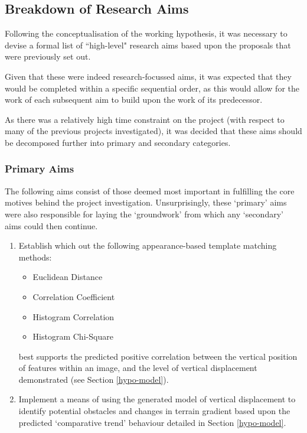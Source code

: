 \subsection{Breakdown of Research Aims}

Following the conceptualisation of the working hypothesis, it was necessary to devise a formal list of ``high-level" research aims based upon the proposals that were previously set out. 

Given that these were indeed research-focussed aims, it was expected that they would be completed within a specific sequential order, as this would allow for the work of each subsequent aim to build upon the work of its predecessor.

As there was a relatively high time constraint on the project (with respect to many of the previous projects investigated), it was decided that these aims should be decomposed further into primary and secondary categories.

\subsubsection{Primary Aims}

The following aims consist of those deemed most important in fulfilling the core motives behind the project investigation. Unsurprisingly, these `primary' aims were also responsible for laying the `groundwork' from which any `secondary' aims could then continue.  

\begin{enumerate}
	\item Establish which out the following appearance-based template matching methods:
		\begin{itemize}
			\item Euclidean Distance
			\item Correlation Coefficient
			\item Histogram Correlation
			\item Histogram Chi-Square
		\end{itemize}
	 best supports the predicted positive correlation between the vertical position of features within an image, and the level of vertical displacement demonstrated (see Section \ref{hypo-model}).
	 \item Implement a means of using the generated model of vertical displacement to identify potential obstacles and changes in terrain gradient based upon the predicted `comparative trend' behaviour detailed in Section \ref{hypo-model}.
\end{enumerate}

